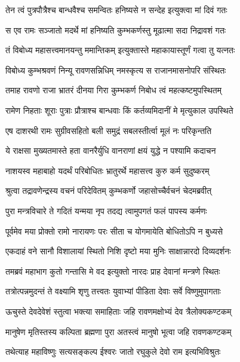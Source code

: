 \twolineshloka
{तेन त्वं पुत्रपौत्रैश्च बान्धवैश्च समन्वितः}
{हनिष्यसे न सन्देह इत्युक्त्वा मां दिवं गतः} %

\twolineshloka
{स एव रामः सञ्जातो मदर्थे मां हनिष्यति}
{कुम्भकर्णस्तु मूढात्मा सदा निद्रावशं गतः} %

\twolineshloka
{तं विबोध्य महासत्त्वमानयन्तु ममान्तिकम्}
{इत्युक्तास्ते महाकायास्तूर्णं गत्वा तु यत्नतः} %

\twolineshloka
{विबोध्य कुम्भश्रवणं निन्यू रावणसन्निधिम्}
{नमस्कृत्य स राजानमासनोपरि संस्थितः} %

\twolineshloka
{तमाह रावणो राजा भ्रातरं दीनया गिरा}
{कुम्भकर्ण निबोध त्वं महत्कष्टमुपस्थितम्} %

\twolineshloka
{रामेण निहताः शूराः पुत्राः प्रौत्राश्च बान्धवाः}
{किं कर्तव्यमिदानीं मे मृत्युकाल उपस्थिते} %

\twolineshloka
{एष दाशरथी रामः सुग्रीवसहितो बली}
{समुद्रं सबलस्तीर्त्वा मूलं नः परिकृन्तति} %

\twolineshloka
{ये राक्षसा मुख्यतमास्ते हता वानरैर्युधि}
{वानराणां क्षयं युद्धे न पश्यामि कदाचन} %

\twolineshloka
{नाशयस्व महाबाहो यदर्थं परिबोधितः}
{भ्रातुरर्थे महासत्त्व कुरु कर्म सुदुष्करम्} %

\twolineshloka
{श्रुत्वा तद्रावणेन्द्रस्य वचनं परिदेवितम्}
{कुम्भकर्णो जहासोच्चैर्वचनं चेदमब्रवीत्} %

\twolineshloka
{पुरा मन्त्रविचारे ते गदितं यन्मया नृप}
{तदद्य त्वामुपगतं फलं पापस्य कर्मणः} %

\twolineshloka
{पूर्वमेव मया प्रोक्तो रामो नारायणः परः}
{सीता च योगमायेति बोधितोऽपि न बुध्यसे} %

\twolineshloka
{एकदाहं वने सानौ विशालायां स्थितो निशि}
{दृष्टो मया मुनिः साक्षान्नारदो दिव्यदर्शनः} %

\twolineshloka
{तमब्रवं महाभाग कुतो गन्तासि मे वद}
{इत्युक्तो नारदः प्राह देवानां मन्त्रणे स्थितः} %

\twolineshloka
{तत्रोत्पन्नमुदन्तं ते वक्ष्यामि शृणु तत्त्वतः}
{युवाभ्यां पीडिता देवाः सर्वे विष्णुमुपागताः} %

\twolineshloka
{ऊचुस्ते देवदेवेशं स्तुत्वा भक्त्या समाहिताः}
{जहि रावणमक्षोभ्यं देव त्रैलोक्यकण्टकम्} %

\twolineshloka
{मानुषेण मृतिस्तस्य कल्पिता ब्रह्मणा पुरा}
{अतस्त्वं मानुषो भूत्वा जहि रावणकण्टकम्} %

\twolineshloka
{तथेत्याह महाविष्णुः सत्यसङ्कल्प ईश्वरः}
{जातो रघुकुले देवो राम इत्यभिविश्रुतः} %

